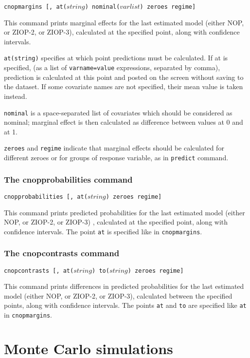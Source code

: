 \documentclass[letterpaper,fleqn,12pt]{article}
\begin{document}
\begin{onehalfspace}
\texttt{cnopmargins [, at($string$) nominal($varlist$) zeroes regime]}

This command prints marginal effects for the last estimated model (either
NOP, or ZIOP-2, or ZIOP-3), calculated at the specified point, along with
confidence intervals.

\texttt{at(string)} specifies at which point predictions must be calculated.
If at is specified, (as a list of \texttt{varname=value} expressions,
separated by comma), prediction is calculated at this point and posted on
the screen without saving to the dataset. If some covariate names are not
specified, their mean value is taken instead.

\texttt{nominal} is a space-separated list of covariates which should be
considered as nominal; marginal effect is then calculated as difference
between values at 0 and at 1.

\texttt{zeroes} and \texttt{regime} indicate that marginal effects should be
calculated for different zeroes or for groups of response variable, as in 
\texttt{predict} command.

\subsubsection*{The cnopprobabilities command}

\texttt{cnopprobabilities [, at($string$) zeroes regime]}

This command prints predicted probabilities for the last estimated model
(either NOP, or ZIOP-2, or ZIOP-3) , calculated at the specified point,
along with confidence intervals. The point \texttt{at} is specified like in 
\texttt{cnopmargins}.

\subsubsection*{The cnopcontrasts command}

\texttt{cnopcontrasts [, at($string$) to($string$) zeroes regime] }

This command prints differences in predicted probabilities for the last
estimated model (either NOP, or ZIOP-2, or ZIOP-3), calculated between the
specified points, along with confidence intervals. The points \texttt{at}
and \texttt{to} are specified like \texttt{at} in \texttt{cnopmargins}.

\section{Monte Carlo simulations}


\end{onehalfspace}
\end{document}
